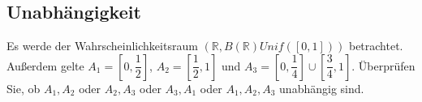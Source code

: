 \documentclass[paper=a4, fontsize=11pt]{scrartcl}
\numberwithin{equation}{section}
\numberwithin{figure}{section}
\numberwithin{table}{section}
\begin{document}
\subsection{Unabhängigkeit}
Es werde der Wahrscheinlichkeitsraum $(\mathbb{R},B(\mathbb{R})Unif([0,1]))$ betrachtet. Außerdem gelte $A_{1}=[0, \dfrac{1}{2}]$, $A_{2}=[\dfrac{1}{2},1]$ und $A_{3}=[0,\dfrac{1}{4}] \cup [\dfrac{3}{4},1]$. Überprüfen Sie, ob $A_{1},A_{2}$ oder $A_{2},A_{3}$ oder $A_{3},A_{1}$ oder $A_{1},A_{2},A_{3}$ unabhängig sind. \\

\end{document}
